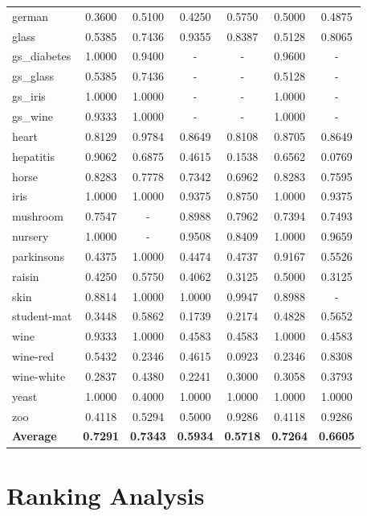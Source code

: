 \documentclass[11pt,a4paper]{article}
\begin{document}
\begin{longtable}{lcccccc}
german & 0.3600 & 0.5100 & 0.4250 & 0.5750 & 0.5000 & 0.4875 \\
glass & 0.5385 & 0.7436 & 0.9355 & 0.8387 & 0.5128 & 0.8065 \\
gs\_diabetes & 1.0000 & 0.9400 & - & - & 0.9600 & - \\
gs\_glass & 0.5385 & 0.7436 & - & - & 0.5128 & - \\
gs\_iris & 1.0000 & 1.0000 & - & - & 1.0000 & - \\
gs\_wine & 0.9333 & 1.0000 & - & - & 1.0000 & - \\
heart & 0.8129 & 0.9784 & 0.8649 & 0.8108 & 0.8705 & 0.8649 \\
hepatitis & 0.9062 & 0.6875 & 0.4615 & 0.1538 & 0.6562 & 0.0769 \\
horse & 0.8283 & 0.7778 & 0.7342 & 0.6962 & 0.8283 & 0.7595 \\
iris & 1.0000 & 1.0000 & 0.9375 & 0.8750 & 1.0000 & 0.9375 \\
mushroom & 0.7547 & - & 0.8988 & 0.7962 & 0.7394 & 0.7493 \\
nursery & 1.0000 & - & 0.9508 & 0.8409 & 1.0000 & 0.9659 \\
parkinsons & 0.4375 & 1.0000 & 0.4474 & 0.4737 & 0.9167 & 0.5526 \\
raisin & 0.4250 & 0.5750 & 0.4062 & 0.3125 & 0.5000 & 0.3125 \\
skin & 0.8814 & 1.0000 & 1.0000 & 0.9947 & 0.8988 & - \\
student-mat & 0.3448 & 0.5862 & 0.1739 & 0.2174 & 0.4828 & 0.5652 \\
wine & 0.9333 & 1.0000 & 0.4583 & 0.4583 & 1.0000 & 0.4583 \\
wine-red & 0.5432 & 0.2346 & 0.4615 & 0.0923 & 0.2346 & 0.8308 \\
wine-white & 0.2837 & 0.4380 & 0.2241 & 0.3000 & 0.3058 & 0.3793 \\
yeast & 1.0000 & 0.4000 & 1.0000 & 1.0000 & 1.0000 & 1.0000 \\
zoo & 0.4118 & 0.5294 & 0.5000 & 0.9286 & 0.4118 & 0.9286 \\
\midrule \textbf{Average} & \textbf{0.7291} & \textbf{0.7343} & \textbf{0.5934} & \textbf{0.5718} & \textbf{0.7264} & \textbf{0.6605} \\
\bottomrule\end{longtable}

\section{Ranking Analysis}
\end{document}
